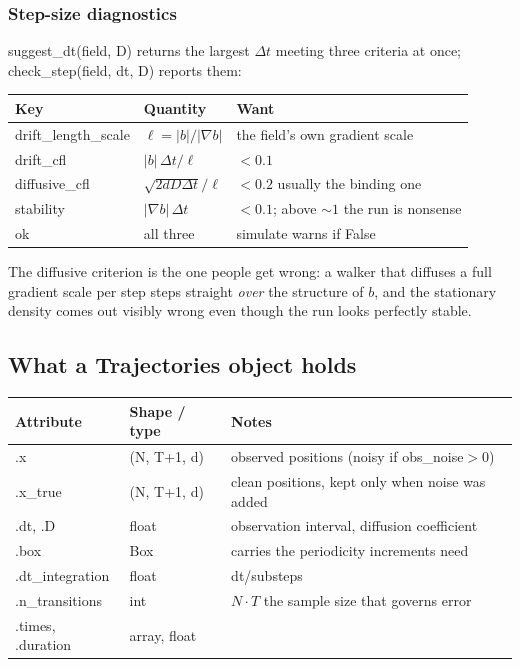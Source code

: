 \documentclass[11pt,a4paper]{article}
\newcommand{\code}[1]{{\ttfamily\small #1}}
\begin{document}
\subsubsection*{Step-size diagnostics}

\code{suggest\_dt(field, D)} returns the largest $\Delta t$ meeting three criteria at
once; \code{check\_step(field, dt, D)} reports them:

\begin{center}
\begin{tabular}{@{}L{0.22\textwidth} L{0.22\textwidth} L{0.48\textwidth}@{}}
\toprule
\textbf{Key} & \textbf{Quantity} & \textbf{Want} \\
\midrule
\code{drift\_length\_scale} & $\ell = |b|/|\nabla b|$ & the field's own gradient scale \\
\code{drift\_cfl}     & $|b|\,\Delta t/\ell$          & $<0.1$ \\
\code{diffusive\_cfl} & $\sqrt{2dD\Delta t}/\ell$     & $<0.2$ \textemdash{} usually the binding one \\
\code{stability}      & $|\nabla b|\,\Delta t$        & $<0.1$; above $\sim1$ the run is nonsense \\
\code{ok}             & all three                     & \code{simulate} warns if \code{False} \\
\bottomrule
\end{tabular}
\end{center}

The diffusive criterion is the one people get wrong: a walker that diffuses a full
gradient scale per step steps straight \emph{over} the structure of $b$, and the
stationary density comes out visibly wrong even though the run looks perfectly stable.

\subsection{What a \code{Trajectories} object holds}

\begin{center}
\begin{tabular}{@{}L{0.24\textwidth} L{0.24\textwidth} L{0.44\textwidth}@{}}
\toprule
\textbf{Attribute} & \textbf{Shape / type} & \textbf{Notes} \\
\midrule
\code{.x}            & \code{(N, T+1, d)} & observed positions (noisy if \code{obs\_noise}$>0$) \\
\code{.x\_true}      & \code{(N, T+1, d)} & clean positions, kept only when noise was added \\
\code{.dt}, \code{.D}& float              & observation interval, diffusion coefficient \\
\code{.box}          & \code{Box}         & carries the periodicity increments need \\
\code{.dt\_integration} & float           & \code{dt/substeps} \\
\code{.n\_transitions}  & int             & $N\!\cdot\!T$ \textemdash{} the sample size that governs error \\
\code{.times}, \code{.duration} & array, float & \\
\bottomrule
\end{tabular}
\end{center}
\end{document}
